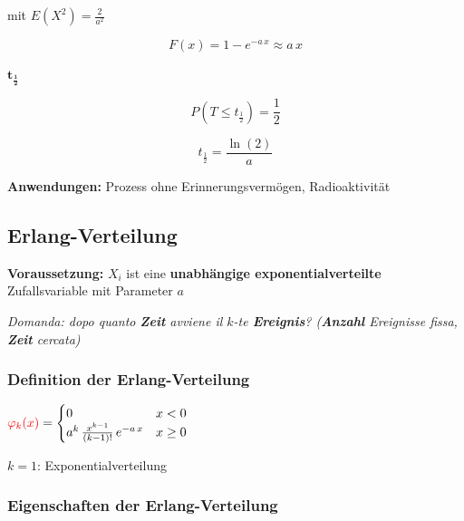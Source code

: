 mit $E(X^2) = \frac{2}{a^2}$

\vspace{0.2cm}

$$ F(x) = 1 - e^{-a\,x} \approx a\,x $$

\vspace{0.2cm}

 $\bm{t_{\frac{1}{2}}}$

\begin{minipage}[c]{0.48\columnwidth}
	$$ P(T \leq t_{\frac{1}{2}} ) = \frac{1}{2} $$
\end{minipage}
\hfill
\begin{minipage}[c]{0.48\columnwidth}
	$$ \boxed{ t_{\frac{1}{2}} = \frac{\ln(2)}{a} } $$
\end{minipage}


\vspace{0.15cm}
\textbf{Anwendungen:} Prozess ohne Erinnerungsvermögen, Radioaktivität


\subsection{Erlang-Verteilung}

\textbf{Voraussetzung:} $X_i$ ist eine \textbf{unabhängige exponentialverteilte} Zufallsvariable mit Parameter $a$

\textit{Domanda: dopo quanto \textbf{Zeit} avviene il $k$-te \textbf{Ereignis}? (\textbf{Anzahl} Ereignisse fissa, \textbf{Zeit} cercata)}


\subsubsection{Definition der Erlang-Verteilung}

\begin{minipage}[c]{0.48\columnwidth}
	${\color{red}\varphi_k(x)} = \begin{cases} 
		0 											& x < 0 \\
		a^k \, \frac{x^{k-1}}{(k-1)!}\, e^{-a \, x} & x \geq 0 
	\end{cases}$ 
\end{minipage}
\hfill
\begin{minipage}[c]{0.48\columnwidth}
	$k = 1$: Exponentialverteilung
\end{minipage}


\subsubsection{Eigenschaften der Erlang-Verteilung}

